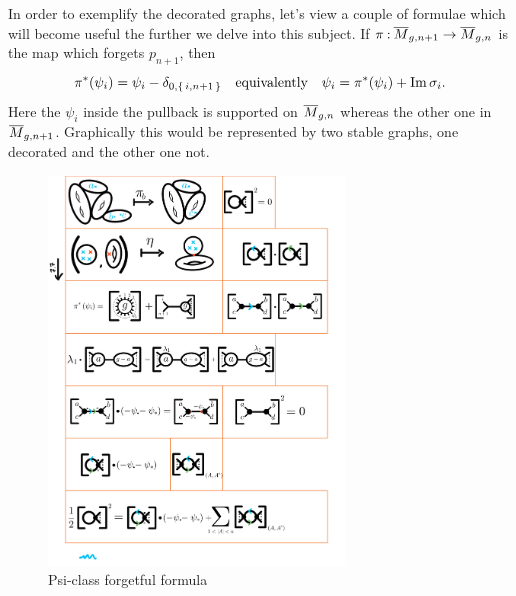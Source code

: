 \documentclass[12pt]{memoir}
\begin{document}
\begin{Ex}\label{ex-psi-class-forgetful-identity}
    In order to exemplify the decorated graphs, let's view a couple of formulae which will become useful the further we delve into this subject. If $\pi\mathbin{:}\overline M_{g,n+1}\to\overline M_{g,n}$ is the map which forgets $p_{n+1}$, then 
    $$\pi^\ast(\psi_i)=\psi_i-\delta_{0,\{\,i,n+1\,\}}\quad\text{equivalently}\quad\psi_i=\pi^\ast(\psi_i)+\Im\sigma_i.$$
    Here the $\psi_i$ inside the pullback is supported on $\overline M_{g,n}$ whereas the other one in $\overline{M}_{g,n+1}$. Graphically this would be represented by two stable graphs, one decorated and the other one not.
    \begin{figure}[h!]
        \centering
        \includegraphics[width=0.7\textwidth, trim= 1.3cm 17cm 9cm 8cm,clip]{../figs/FigsDNnotability2.pdf}
        \caption{Psi-class forgetful formula}
        \label{fig:psi-class-forget}
    \end{figure}
\end{Ex}
\end{document}
